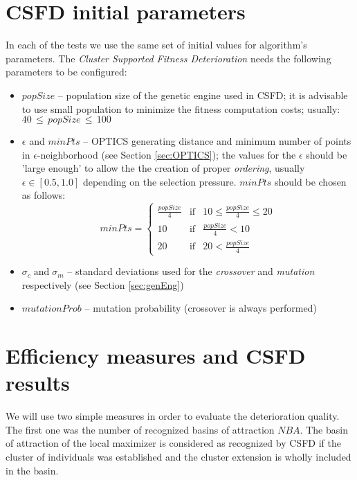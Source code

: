 \section{CSFD initial parameters}
\label{sec:InitPar}


In each of the tests we use the same set of initial values for algorithm's
parameters. The \textit{Cluster Supported Fitness Deterioration} needs the
following parameters to be configured: 
\begin{itemize}
  
  \item $popSize$ -- population size of the genetic engine used in CSFD;
  it is advisable to use small population to minimize the fitness computation
  costs; usually: $40 \, \leq \, popSize \, \leq \, 100$
  
  \item $\epsilon$ and $minPts$ -- OPTICS generating distance and minimum number
  of points in $\epsilon$-neighborhood (see Section \ref{sec:OPTICS});
  the values for the $\epsilon$ should be 'large enough' to allow the
  the creation of proper \textit{ordering}, usually $\epsilon \in [0.5, 1.0]$
  depending on the selection pressure. $minPts$ should be chosen as follows:
  \begin{equation}
  \label{eqn:minPts}
  minPts = \left\{
  \begin{array}{ccc}
  \frac{popSize}{4} & \text{if} & 10 \leq \frac{popSize}{4} \leq  20\\
  10 & \text{if} & \frac{popSize}{4} < 10\\
  20 & \text{if} & 20 < \frac{popSize}{4}
  \end{array}
  \right.
  \end{equation}
  
  \item $\sigma_c \; \text{and} \; \sigma_m$ -- standard
  deviations used for the \textit{crossover} and \textit{mutation} respectively
  (see Section \ref{sec:genEng})
  
  \item $mutationProb$ -- mutation probability (crossover is always performed)
   
\end{itemize}

\section{Efficiency measures and CSFD results}
\label{sec:Measures}
We will use two simple measures in order to evaluate the deterioration
quality. The first one was the number of recognized basins of
attraction $NBA$.
The basin of attraction of the local maximizer is considered as recognized
by CSFD if the cluster of individuals was established and 
the cluster extension is wholly included in the basin.


